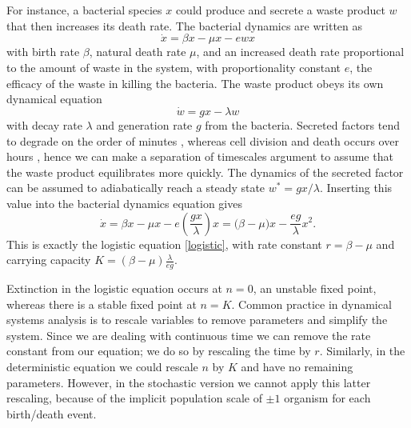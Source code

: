 For instance, a bacterial species $x$ could produce and secrete a waste product $w$ that then increases its death rate. 
The bacterial dynamics are written as
\begin{equation*}
\dot{x} = \beta x - \mu x - e w x
\end{equation*}
with birth rate $\beta$, natural death rate $\mu$, and an increased death rate proportional to the amount of waste in the system, with proportionality constant $e$, the efficacy of the waste in killing the bacteria. 
The waste product obeys its own dynamical equation
\begin{equation*}
\dot{w} = g x - \lambda w
\end{equation*}
with decay rate $\lambda$ and generation rate $g$ from the bacteria. 
Secreted factors tend to degrade on the order of minutes \cite{Belle2006}, whereas cell division and death occurs over hours \cite{Powell1956,Lenski1991}, hence we can make a separation of timescales argument to assume that the waste product equilibrates more quickly. 
The dynamics of the secreted factor can be assumed to adiabatically reach a steady state $w^* = g x/\lambda$. 
Inserting this value into the bacterial dynamics equation gives
\begin{equation*}
\dot{x} = \beta x - \mu x - e \left( \frac{g x}{\lambda} \right) x = \big( \beta - \mu \big) x - \frac{e g}{\lambda} x^2.
\end{equation*}
This is exactly the logistic equation \ref{logistic}, with rate constant $r = \beta - \mu$ and carrying capacity $K = \left( \beta - \mu \right) \frac{\lambda}{e g}$. 

Extinction in the logistic equation occurs at $n=0$, an unstable fixed point, whereas there is a stable fixed point at $n=K$. %
Common practice in dynamical systems analysis is to rescale variables to remove parameters and simplify the system.
Since we are dealing with continuous time we can remove the rate constant from our equation; we do so by rescaling the time by $r$.
Similarly, in the deterministic equation we could rescale $n$ by $K$ and have no remaining parameters.
However, in the stochastic version we cannot apply this latter rescaling, because of the implicit population scale of $\pm1$ organism for each birth/death event. %


